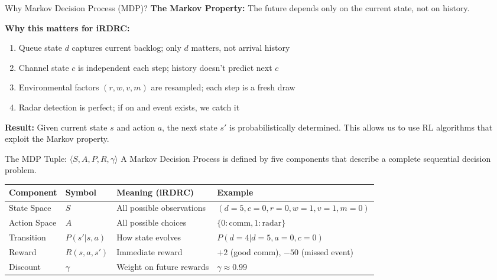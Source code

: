 \documentclass{beamer}
\begin{document}
\begin{frame}{Why Markov Decision Process (MDP)?}
  \textbf{The Markov Property:} The future depends only on the current state, not on history.

  \vspace{0.2cm}
  \textbf{Why this matters for iRDRC:}

  \begin{enumerate}
    \item Queue state $d$ captures current backlog; only $d$ matters, not arrival history
    \item Channel state $c$ is independent each step; history doesn't predict next $c$
    \item Environmental factors $(r, w, v, m)$ are resampled; each step is a fresh draw
    \item Radar detection is perfect; if on and event exists, we catch it
  \end{enumerate}

  \vspace{0.3cm}
  \textbf{Result:} Given current state $s$ and action $a$, the next state $s'$ is probabilistically determined. This allows us to use RL algorithms that exploit the Markov property.
\end{frame}

\begin{frame}{The MDP Tuple: $\langle S, A, P, R, \gamma \rangle$}
  A Markov Decision Process is defined by five components that describe a complete sequential decision problem.

  \vspace{0.1cm}
  \scriptsize
  \begin{tabular}{|p{1.6cm}|p{1.4cm}|p{3.2cm}|p{2.8cm}|}
    \hline
    \textbf{Component} & \textbf{Symbol} & \textbf{Meaning (iRDRC)} & \textbf{Example} \\
    \hline
    State Space & $S$ & All possible observations & $(d=5, c=0, r=0, w=1, v=1, m=0)$ \\
    \hline
    Action Space & $A$ & All possible choices & $\{0: \text{comm}, 1: \text{radar}\}$ \\
    \hline
    Transition & $P(s'|s,a)$ & How state evolves & $P(d=4 | d=5, a=0, c=0)$ \\
    \hline
    Reward & $R(s,a,s')$ & Immediate reward & $+2$ (good comm), $-50$ (missed event) \\
    \hline
    Discount & $\gamma$ & Weight on future rewards & $\gamma \approx 0.99$ \\
    \hline
  \end{tabular}

  \normalsize
\end{frame}
\end{document}
